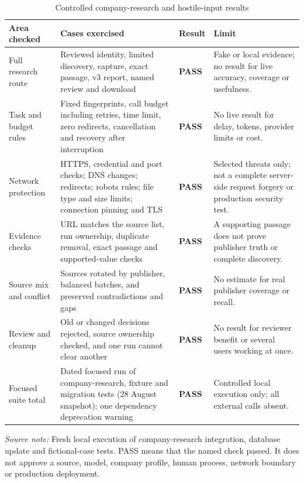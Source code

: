 \clearpage
\begin{table}[p]
  \centering
  \scriptsize
  \setlength{\tabcolsep}{3pt}
  \renewcommand{\arraystretch}{1.08}
  \begin{tabularx}{\textwidth}{@{}P{0.22\textwidth}P{0.27\textwidth}P{0.20\textwidth}Y@{}}
    \toprule
    \textbf{Area checked} & \textbf{Cases exercised} & \textbf{Result} & \textbf{Limit} \\
    \midrule
    Full research route & Reviewed identity, limited discovery, capture, exact passage, v3 report, named review and download & \textbf{PASS} & Fake or local evidence; no result for live accuracy, coverage or usefulness. \\
    Task and budget rules & Fixed fingerprints, call budget including retries, time limit, zero redirects, cancellation and recovery after interruption & \textbf{PASS} & No live result for delay, tokens, provider limits or cost. \\
    Network protection & HTTPS, credential and port checks; DNS changes; redirects; robots rules; file type and size limits; connection pinning and TLS & \textbf{PASS} & Selected threats only; not a complete server-side request forgery or production security test. \\
    Evidence checks & URL matches the source list, run ownership, duplicate removal, exact passage and supported-value checks & \textbf{PASS} & A supporting passage does not prove publisher truth or complete discovery. \\
    Source mix and conflict & Sources rotated by publisher, balanced batches, and preserved contradictions and gaps & \textbf{PASS} & No estimate for real publisher coverage or recall. \\
    Review and cleanup & Old or changed decisions rejected, source ownership checked, and one run cannot clear another & \textbf{PASS} & No result for reviewer benefit or several users working at once. \\
    Focused suite total & Dated focused run of company-research, fixture and migration tests (28 August snapshot); one dependency deprecation warning & \textbf{PASS} & Controlled local execution only; all external calls absent. \\
    \bottomrule
  \end{tabularx}

  \caption{Controlled company-research and hostile-input results}
  \label{tab:eval-company-adversarial-results}

  \vspace{4pt}
  \parbox{\textwidth}{\scriptsize
    \textit{Source note:} Fresh local execution of company-research integration, database update
    and fictional-case tests. PASS means that the named check passed. It does not approve a source,
    model, company profile, human process, network boundary or production deployment.}
\end{table}
\clearpage
